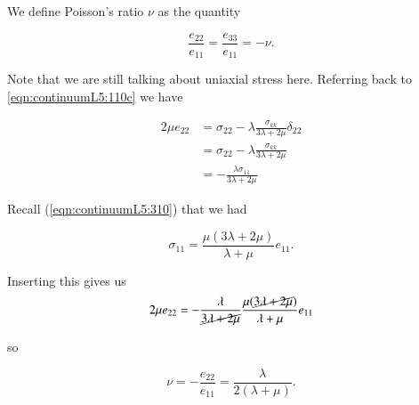 

We define Poisson's ratio $\nu$ as the quantity

\begin{equation}\label{eqn:continuumL5:350}
\frac{e_{22}}{e_{11}} = \frac{e_{33}}{e_{11}} = - \nu.
\end{equation}

Note that we are still talking about uniaxial stress here.  Referring back to \ref{eqn:continuumL5:110c} we have

\begin{align*}
2 \mu e_{2 2}
&= \sigma_{2 2} - \lambda \frac{\sigma_{k k}}{3 \lambda + 2 \mu} \delta_{2 2} \\
&= \sigma_{2 2} - \lambda \frac{\sigma_{k k}}{3 \lambda + 2 \mu} \\
&= - \frac{\lambda \sigma_{11}}{3 \lambda + 2 \mu}
\end{align*}

Recall (\ref{eqn:continuumL5:310}) that we had

\begin{equation}\label{eqn:continuumL5:370}
\sigma_{11} = \frac{\mu (3 \lambda + 2 \mu)}{\lambda + \mu} e_{11}.
\end{equation}

Inserting this gives us
\begin{align*}
2 \mu e_{22} 
= - \frac{\lambda}{\cancel{3 \lambda + 2 \mu}} \frac{ \mu (\cancel{3 \lambda + 2\mu})}{\lambda + \mu} e_{11}
\end{align*}

so

\begin{equation}\label{eqn:continuumL5:410}
\boxed{
\nu = -\frac{e_{22}}{e_{11}} = \frac{\lambda}{2 (\lambda + \mu)}.
}
\end{equation}

